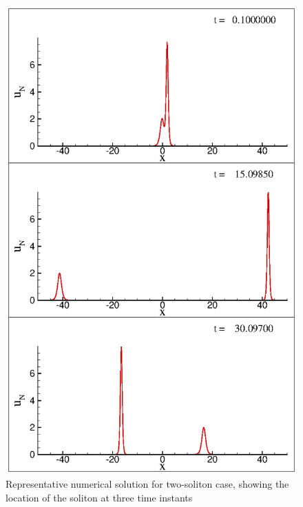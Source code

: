 \documentclass{svjour3}                    %
\begin{document}
\begin{figure}
\centerline{
\includegraphics[width=0.5\linewidth]{Fig_15}
}
\caption{Representative numerical solution for two-soliton case, showing the location of the soliton at three time instants}
\label{fig:two1}
\end{figure}
\end{document}
